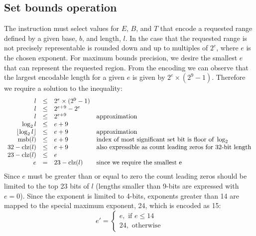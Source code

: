 \subsection{Set bounds operation}
The  instruction must select values for $E$, $B$, and $T$ that encode a requested range defined by a given base, $b$, and length, $l$.
In the case that the requested range is not precisely representable \cbase{} is rounded down and \ctop{} up to multiples of $2^e$, where $e$ is the chosen exponent.
For maximum bounds precision, we desire the smallest $e$ that can represent the requested region.
From the encoding we can observe that the largest encodable length for a given $e$ is given by $2^e \times (2^9 - 1)$.
Therefore we require a solution to the inequality:
\[
\begin{array}{r c l l}
l & \le & 2^e \times (2^9 - 1)\\
l & \le & 2^{e+9} - 2^e\\
l & \le & 2^{e+9} & \text{approximation}\\
\log_2 l & \le & e+9 \\
\lfloor \log_2 l \rfloor & \le & e + 9 & \text{approximation} \\
\operatorname{msb}(l) & \le & e + 9 & \text{index of most significant set bit is floor of } \log_2 \\
32 - \operatorname{clz}(l) & \le & e + 9 & \text{also expressible as count leading zeros for 32-bit length} \\
23 - \operatorname{clz}(l) & \le & e \\
e & = & 23 - \operatorname{clz}(l) & \text{since we require the smallest e} \\
\end{array}
\]
Since $e$ must be greater than or equal to zero the count leading zeros should be limited to the top 23 bits of $l$ (lengths smaller than 9-bits are expressed with $e = 0$).
Since the exponent is limited to 4-bits, exponents greater than 14 are mapped to the special maximum exponent, 24, which is encoded as 15:
\[
e'=
\begin{cases}
  e,\text{ if } e \le 14 \\
  24,\text{ otherwise}
\end{cases}
\]
